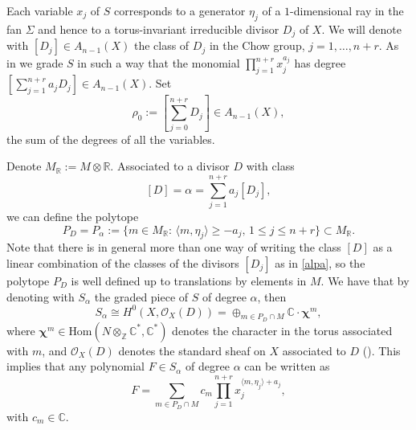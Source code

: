 \documentclass[a4paper,11pt]{amsart}
\newcommand{\C}{\mathbb{C}}
\newcommand{\R}{\mathbb{R}}
\newcommand{\Z}{\mathbb{Z}}
\newcommand{\cO}{{\mathcal O}}
\newcommand{\bfchi}{{\boldsymbol{\chi}}}
\numberwithin{thm}{section}
\numberwithin{equation}{section}
\theoremstyle{definition}
\theoremstyle{plain}
\begin{document}
Each variable $x_j$ of $S$ corresponds to a generator $\eta_j$ of a $1$-dimensional ray in the fan $\Sigma$ and hence to a torus-invariant irreducible divisor $D_j$ of $X.$ We will  denote with $[D_j]\in A_{n-1}(X)$ the class of $D_j$ in the Chow group, $j=1,\ldots, n+r.$ As in \cite{cox95} we grade $S$ in such a way that the monomial
$\prod_{j=1}^{n+r}x_j^{a_j}$ has degree $[\sum_{j=1}^{n+r} a_jD_j]\in A_{n-1}(X).$ 
Set 
\begin{equation} \label{eq:rho}
\rho_0:=[\sum_{j=0}^{n+r}D_j]\in A_{n-1}(X),
\end{equation}
the sum of the degrees of all the variables. 



Denote $M_\R:= M\otimes\R$. Associated to a divisor $D$ with class 
\begin{equation}\label{alpa}
[D]= \alpha = \sum_{j=1}^{n+r} a_j [D_j],
\end{equation} we can define the polytope
\begin{equation}\label{pd}
P_D = P_\alpha :=\{m\in M_\R:\,\langle m,\eta_j\rangle\geq-a_j,\,1\leq j\leq n+r\}\subset M_\R.
\end{equation}
Note that there is in general more than one way of writing the class $[D]$ as a linear combination of the classes of the divisors $[D_j]$ as in \eqref{alpa}, so the polytope $P_D$ is well defined up to translations by elements in $M$.
We have that by denoting with $S_\alpha$ the graded piece of $S$ of degree $\alpha$, then
\begin{equation}\label{kor}
S_\alpha \cong H^0(X,\cO_X(D))=\oplus_{m\in P_D\cap M}\C\cdot \bfchi^{m},
\end{equation}
where $\bfchi^m\in \mbox{Hom}(N\otimes_\Z\C^*,\C^*)$ denotes the  character in the torus associated with $m$, and $\cO_X(D)$ denotes the standard sheaf on $X$ associated to  $D$ (\cite[Proposition 1.1]{cox95}). This implies that any polynomial $F\in S_\alpha$ of degree $\alpha$ can be written as
\begin{equation}\label{eFe}
F=\sum_{m\in P_D\cap M}c_m\prod_{j=1}^{n+r} x_j^{\langle m,\eta_j\rangle+a_j},
\end{equation}
with $c_m\in\C.$
\end{document}
